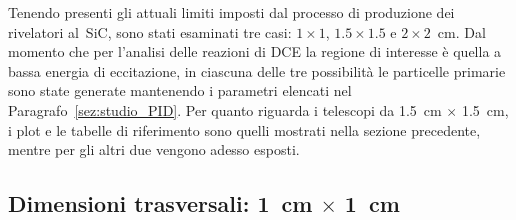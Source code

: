 Tenendo presenti gli attuali limiti imposti dal processo di produzione dei rivelatori al~SiC, sono stati esaminati tre casi: $1 \times 1$, $1.5 \times 1.5$ e $2 \times 2$~cm. 
Dal momento che per l'analisi delle reazioni di DCE la regione di interesse è quella a bassa energia di eccitazione, in ciascuna delle tre possibilità le particelle primarie sono state generate mantenendo i parametri elencati nel Paragrafo~\ref{sez:studio_PID}.
Per quanto riguarda i telescopi da 1.5~cm $\times$ 1.5~cm, i plot e le tabelle di riferimento sono quelli mostrati nella sezione precedente, mentre per gli altri due vengono adesso esposti.


\subsection*{Dimensioni trasversali: 1~cm $\times$ 1~cm}




